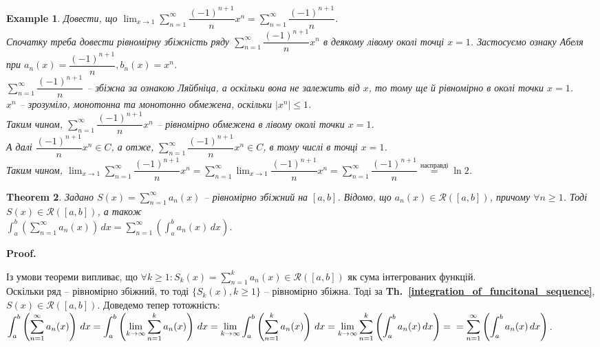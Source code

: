 \documentclass[a4paper, 10pt]{article}
\makeatletter
\def\huge{\displaystyle}
\theoremstyle{theoremdd}
\newtheorem{theorem}{Theorem}[subsection]
\theoremstyle{theoremdd}
\theoremstyle{theoremdd}
\theoremstyle{theoremdd}
\theoremstyle{theoremdd}
\newtheorem{example}[theorem]{Example}
\theoremstyle{theoremdd}
\theoremstyle{theoremdd}
\theoremstyle{theoremdd}
\theoremstyle{theoremdd}
\newcommand\thref[1]{\textbf{Th.~\ref{#1}}}
\renewenvironment{proof}[1][Proof.\\]{\par
\pushQED{\hfill \qed}%
\normalfont \topsep6\p@\@plus6\p@\relax
\trivlist
\item\relax
{\bfseries
#1\@addpunct{.}}\hspace\labelsep\ignorespaces
}{%
\popQED\endtrivlist\@endpefalse
}
\makeatother
\begin{document}
\begin{example}
Довести, що $\huge\lim_{x \to 1} \huge\sum_{n=1}^\infty \dfrac{(-1)^{n+1}}{n}x^n = \sum_{n=1}^\infty\dfrac{(-1)^{n+1}}{n}$.\\
Спочатку треба довести рівномірну збіжність ряду $\huge\sum_{n=1}^\infty \dfrac{(-1)^{n+1}}{n} x^n$ в деякому лівому околі точці $x = 1$. Застосуємо ознаку Абеля при $a_n(x) = \dfrac{(-1)^{n+1}}{n}, b_n(x) = x^n$.\\
$\huge\sum_{n=1}^\infty \dfrac{(-1)^{n+1}}{n}$ -- збіжна за ознакою Ляйбніца, а оскільки вона не залежить від $x$, то тому ще й рівномірно в околі точки $x = 1$.\\
$x^n$ -- зрозуміло, монотонна та монотонно обмежена, оскільки $|x^n| \leq 1$.\\
Таким чином, $\huge\sum_{n=1}^\infty \dfrac{(-1)^{n+1}}{n} x^n$ -- рівномірно обмежена в лівому околі точки $x=1$.\\
А далі $\dfrac{(-1)^{n+1}}{n} x^{n} \in C$, а отже, $\huge\sum_{n=1}^\infty \dfrac{(-1)^{n+1}}{n}x^n \in C$, в тому числі в точці $x=1$.\\
Таким чином, $\huge\lim_{x \to 1} \huge\sum_{n=1}^\infty \dfrac{(-1)^{n+1}}{n}x^n = \huge\sum_{n=1}^\infty \lim_{x \to 1}\dfrac{(-1)^{n+1}}{n}x^n = \sum_{n=1}^\infty \dfrac{(-1)^{n+1}}{n} \overset{\text{насправді}}{=} \ln 2$.
\end{example}


\begin{theorem}
Задано $S(x) = \huge \sum_{n=1}^\infty a_n(x)$ -- рівномірно збіжний на $[a,b]$. Відомо, що $a_n(x) \in \mathcal{R}([a,b])$, причому $\forall n \geq 1$. Тоді $S(x) \in \mathcal{R}([a,b])$, а також\\
$\huge \int_a^b \left( \sum_{n=1}^\infty a_n(x) \right) \,dx = \sum_{n=1}^\infty \left( \int_a^b a_n(x)\,dx \right)$.
\end{theorem}

\begin{proof}
Із умови теореми випливає, що $\forall k \geq 1: S_k(x) = \huge \sum_{n=1}^k a_n(x) \in \mathcal{R}([a,b])$ як сума інтегрованих функцій.\\
Оскільки ряд -- рівномірно збіжний, то тоді $\{S_k(x), k \geq 1\}$ -- рівномірно збіжна. Тоді за \thref{integration_of_funcitonal_sequence}, $S(x) \in \mathcal{R}([a,b])$. Доведемо тепер тотожність:\\
$\huge \int_a^b \left( \sum_{n=1}^\infty a_n(x) \right) \,dx = \int_a^b \left( \lim_{k \to \infty} \sum_{n=1}^k a_n(x) \right) \,dx = \lim_{k \to \infty} \int_a^b \left( \sum_{n=1}^k a_n(x) \right) \,dx = \lim_{k \to \infty} \sum_{n=1}^k \left( \int_a^b a_n(x)\,dx \right) = \\ = \sum_{n=1}^\infty \left( \int_a^b a_n(x)\,dx \right)$.
\end{proof}
\end{document}

